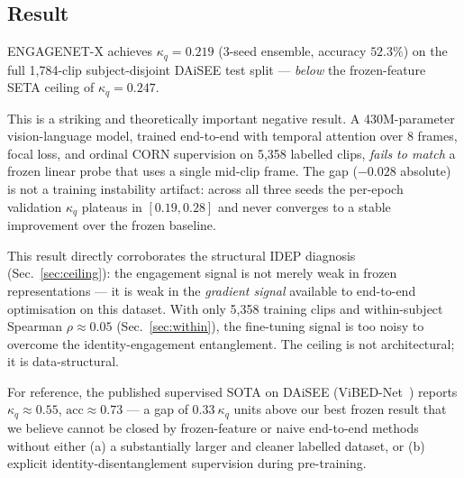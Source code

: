\subsection{Result}

ENGAGENET-X achieves \textbf{$\kappa_q = 0.219$} (3-seed ensemble,
accuracy $52.3\%$) on the full 1{,}784-clip subject-disjoint DAiSEE
test split --- \emph{below} the frozen-feature SETA ceiling of
$\kappa_q = 0.247$.

This is a striking and theoretically important negative result. A
430M-parameter vision-language model, trained end-to-end with temporal
attention over 8 frames, focal loss, and ordinal CORN supervision on
5{,}358 labelled clips, \emph{fails to match} a frozen linear probe
that uses a single mid-clip frame. The gap ($-0.028$ absolute) is not
a training instability artifact: across all three seeds the per-epoch
validation $\kappa_q$ plateaus in $[0.19, 0.28]$ and never converges
to a stable improvement over the frozen baseline.

This result directly corroborates the structural IDEP diagnosis
(Sec.~\ref{sec:ceiling}): the engagement signal is not merely weak in
frozen representations --- it is weak in the \emph{gradient signal}
available to end-to-end optimisation on this dataset. With only
5{,}358 training clips and within-subject Spearman $\rho \approx 0.05$
(Sec.~\ref{sec:within}), the fine-tuning signal is too noisy to
overcome the identity-engagement entanglement. The ceiling is not
architectural; it is data-structural.

For reference, the published supervised SOTA on DAiSEE
(ViBED-Net~\cite{abedi2021vibednet}) reports $\kappa_q \approx 0.55$,
$\mathrm{acc} \approx 0.73$ --- a gap of $0.33~\kappa_q$ units above
our best frozen result that we believe cannot be closed by
frozen-feature or naive end-to-end methods without either (a) a
substantially larger and cleaner labelled dataset, or (b) explicit
identity-disentanglement supervision during pre-training.
